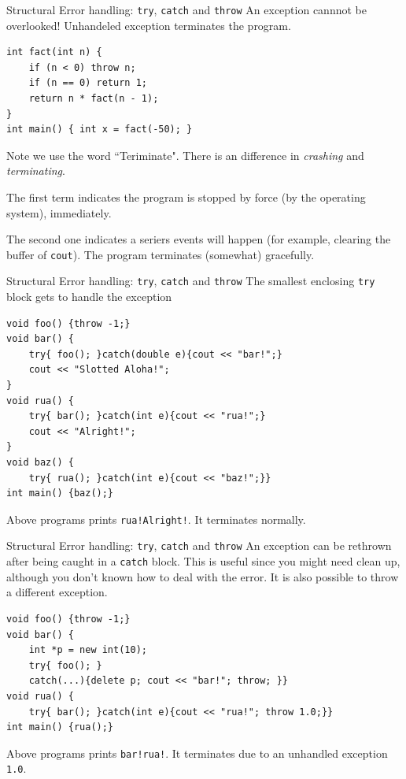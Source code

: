 \begin{frame}[fragile]{Structural Error handling: \texttt{try}, \texttt{catch} and \texttt{throw}}
An exception cannnot be overlooked! Unhandeled exception terminates the program.
\begin{verbatim}
int fact(int n) { 
    if (n < 0) throw n; 
	if (n == 0) return 1;
	return n * fact(n - 1);
}
int main() { int x = fact(-50); }
\end{verbatim}
Note we use the word ``Teriminate". There is an difference in \textit{crashing} and \textit{terminating}. 

The first term indicates the program is stopped by force (by the operating system), immediately. 

The second one indicates a seriers events will happen (for example, clearing the buffer of \texttt{cout}). The program terminates (somewhat) gracefully.
\end{frame}

\begin{frame}[fragile]{Structural Error handling: \texttt{try}, \texttt{catch} and \texttt{throw}}
The smallest enclosing \texttt{try} block gets to handle the exception
\begin{verbatim}
void foo() {throw -1;}
void bar() {
    try{ foo(); }catch(double e){cout << "bar!";}
    cout << "Slotted Aloha!";
}
void rua() {
    try{ bar(); }catch(int e){cout << "rua!";}
    cout << "Alright!";
}
void baz() {
    try{ rua(); }catch(int e){cout << "baz!";}}
int main() {baz();}
\end{verbatim}
Above programs prints \texttt{rua!Alright!}. It terminates normally.

\end{frame}

\begin{frame}[fragile]{Structural Error handling: \texttt{try}, \texttt{catch} and \texttt{throw}}
An exception can be rethrown after being caught in a \texttt{catch} block. This is useful since you might need clean up, although you don't known how to deal with the error. It is also possible to throw a different exception.
\begin{verbatim}
void foo() {throw -1;}
void bar() {
    int *p = new int(10);
    try{ foo(); }
    catch(...){delete p; cout << "bar!"; throw; }}
void rua() {
    try{ bar(); }catch(int e){cout << "rua!"; throw 1.0;}}
int main() {rua();}
\end{verbatim}
Above programs prints \texttt{bar!rua!}. It terminates due to an unhandled exception \texttt{1.0}. 
\end{frame}

